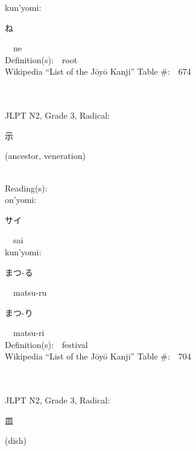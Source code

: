 \begin{multicols}{2}
{\hspace*{1em}}kun'yomi:\ \ \\
{\hspace*{2em}}{\begin{CJK}{UTF8}{min} ね \end{CJK}}\ \ ne\ \ \\
Definition(s):\ \ root \\
Wikipedia ``List of the J\=oy\=o Kanji'' Table \#:\ \ 674 \\
\ \ \\
{\fontsize{34pt}{40pt}  }\ \ \\  %
{JLPT N2, Grade 3, Radical:\ \ {\begin{CJK}{UTF8}{min} 示 \end{CJK}} (ancestor, veneration) } \\
Reading(s):\ \ \\
{\hspace*{1em}}on'yomi:\ \ \\
{\hspace*{2em}}{\begin{CJK}{UTF8}{min} サイ \end{CJK}}\ \ sai\ \ \\
{\hspace*{1em}}kun'yomi:\ \ \\
{\hspace*{2em}}{\begin{CJK}{UTF8}{min} まつ-る \end{CJK}}\ \ matsu-ru\ \ \\
{\hspace*{2em}}{\begin{CJK}{UTF8}{min} まつ-り \end{CJK}}\ \ matsu-ri\ \ \\
Definition(s):\ \ festival \\
Wikipedia ``List of the J\=oy\=o Kanji'' Table \#:\ \ 704 \\
\ \ \\
{\fontsize{34pt}{40pt}  }\ \ \\  %
{JLPT N2, Grade 3, Radical:\ \ {\begin{CJK}{UTF8}{min} 皿 \end{CJK}} (dish) } \\

\end{multicols}
